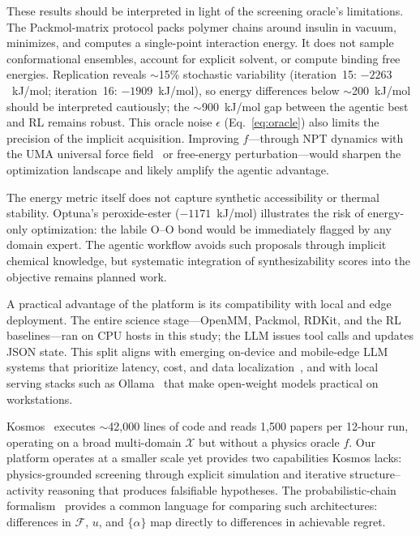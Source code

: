 \documentclass[twocolumn]{fairmeta}
\begin{document}
These results should be interpreted in light of the screening oracle's limitations.
The Packmol-matrix protocol packs polymer chains around insulin in vacuum, minimizes, and computes a single-point interaction energy.
It does not sample conformational ensembles, account for explicit solvent, or compute binding free energies.
Replication reveals ${\sim}$15\% stochastic variability (iteration~15: $-2263$~kJ/mol; iteration~16: $-1909$~kJ/mol), so energy differences below ${\sim}$200~kJ/mol should be interpreted cautiously; the ${\sim}$900~kJ/mol gap between the agentic best and RL remains robust.
This oracle noise $\epsilon$ (Eq.~\ref{eq:oracle}) also limits the precision of the implicit acquisition.
Improving $f$---through NPT dynamics with the UMA universal force field~\cite{wood2025uma} or free-energy perturbation---would sharpen the optimization landscape and likely amplify the agentic advantage.

The energy metric itself does not capture synthetic accessibility or thermal stability.
Optuna's peroxide-ester ($-1171$~kJ/mol) illustrates the risk of energy-only optimization: the labile O--O bond would be immediately flagged by any domain expert.
The agentic workflow avoids such proposals through implicit chemical knowledge, but systematic integration of synthesizability scores into the objective remains planned work.

A practical advantage of the platform is its compatibility with local and edge deployment.
The entire science stage---OpenMM, Packmol, RDKit, and the RL baselines---ran on CPU hosts in this study; the LLM issues tool calls and updates JSON state.
This split aligns with emerging on-device and mobile-edge LLM systems that prioritize latency, cost, and data localization~\cite{xu2024ondevice,qu2024mobileedge}, and with local serving stacks such as Ollama~\cite{ollama2023} that make open-weight models practical on workstations.

Kosmos~\cite{kosmos2025} executes ${\sim}$42,000 lines of code and reads 1,500 papers per 12-hour run, operating on a broad multi-domain $\mathcal{X}$ but without a physics oracle $f$.
Our platform operates at a smaller scale yet provides two capabilities Kosmos lacks: physics-grounded screening through explicit simulation and iterative structure--activity reasoning that produces falsifiable hypotheses.
The probabilistic-chain formalism~\cite{stephens2025mathframing} provides a common language for comparing such architectures: differences in $\mathcal{F}$, $u$, and $\{\alpha\}$ map directly to differences in achievable regret.
\end{document}
